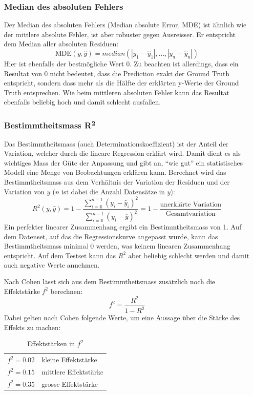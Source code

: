 \documentclass[10pt, a4paper]{article}
\begin{document}
\subsubsection{Median des absoluten Fehlers}
Der Median des absoluten Fehlers (Median absolute Error, MDE) ist ähnlich wie der mittlere absolute Fehler, ist aber robuster gegen Ausreisser. Er entspricht dem Median aller absoluten Residuen:
\[
\text{MDE}(y, \hat{y}) = median(|y_1 - \hat{y}_1|, \dots, |y_n - \hat{y}_n|)
\]
Hier ist ebenfalls der bestmögliche Wert 0. Zu beachten ist allerdings, dass ein Resultat von 0 nicht bedeutet, dass die Prediction exakt der Ground Truth entspricht, sondern dass mehr als die Hälfte der erklärten y-Werte der Ground Truth entsprechen. Wie beim mittleren absoluten Fehler kann das Resultat ebenfalls beliebig hoch und damit schlecht ausfallen.

\subsubsection{Bestimmtheitsmass R\textsuperscript{2}}
Das Bestimmtheitsmass (auch Determinationskoeffizient) ist der Anteil der Variation, welcher durch die lineare Regression erklärt wird. Damit dient es als wichtiges Mass der Güte der Anpassung und gibt an, ``wie gut'' ein statistisches Modell eine Menge von Beobachtungen erklären kann.
Berechnet wird das Bestimmtheitsmass aus dem Verhältnis der Variation der Residuen und der Variation von \(y\) (\(n\) ist dabei die Anzahl Datensätze in \(y\)):
\[
R^2(y, \hat{y}) = 1 - \frac
{\sum_{i=0}^{n-1} (y_i - \hat{y}_i)^2}
{\sum_{i=0}^{n-1} (y_i - \bar{y})^2}
= 1 - \frac{\text{unerklärte Variation}}{\text{Gesamtvariation}}
\]
Ein perfekter linearer Zusammenhang ergibt ein Bestimmtheitsmass von 1. Auf dem Datenset, auf das die Regressionskurve angepasst wurde, kann das Bestimmtheitsmass minimal 0 werden, was keinem linearen Zusammenhang entspricht. Auf dem Testset kann das \(R^2\) aber beliebig schlecht werden und damit auch negative Werte annehmen.

Nach Cohen \cite{cohenstatistics} lässt sich aus dem Bestimmtheitsmass zusätzlich noch die Effektstärke \(f^2\) berechnen:
\[
	f^2 = \frac{R^2}{1 - R^2}
\]
Dabei gelten nach Cohen \cite{cohenstatistics} folgende Werte, um eine Aussage über die Stärke des Effekts zu machen:
\begin{table}[H]
	\centering
	\begin{tabular}{l|l}
		\hline
		\(f^2 = 0.02\) & kleine Effektstärke \\ 
		\(f^2 = 0.15\) & mittlere Effektstärke \\ 
		\(f^2 = 0.35\) & grosse Effektstärke \\
		\hline
	\end{tabular}
	\caption{Effektstärken in \(f^2\)}
\end{table} 
\end{document}
